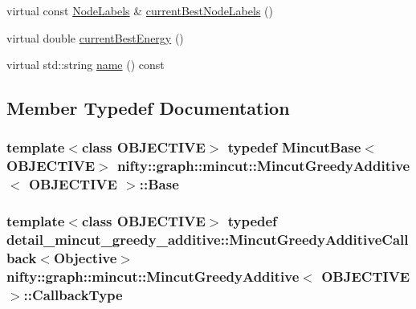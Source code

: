 \begin{DoxyCompactItemize}
virtual const \hyperlink{classnifty_1_1graph_1_1mincut_1_1MincutGreedyAdditive_a462b79779cfbe6ddd82b9e85097ddd3c}{Node\+Labels} \& \hyperlink{classnifty_1_1graph_1_1mincut_1_1MincutGreedyAdditive_aa2e46a61601c171a26a5ef547922084c}{current\+Best\+Node\+Labels} ()
\item 
virtual double \hyperlink{classnifty_1_1graph_1_1mincut_1_1MincutGreedyAdditive_a1c9e625fd28ab644b7cef248e021d412}{current\+Best\+Energy} ()
\item 
virtual std\+::string \hyperlink{classnifty_1_1graph_1_1mincut_1_1MincutGreedyAdditive_aafc5961f3bf92f0053bf3428e5a82786}{name} () const 
\end{DoxyCompactItemize}


\subsection{Member Typedef Documentation}
\hypertarget{classnifty_1_1graph_1_1mincut_1_1MincutGreedyAdditive_aeb493d49b53f21cf9c644baa3b3d00f7}{}
\subsubsection[{Base}]{\setlength{\rightskip}{0pt plus 5cm}template$<$class O\+B\+J\+E\+C\+T\+I\+V\+E$>$ typedef {\bf Mincut\+Base}$<$O\+B\+J\+E\+C\+T\+I\+V\+E$>$ {\bf nifty\+::graph\+::mincut\+::\+Mincut\+Greedy\+Additive}$<$ O\+B\+J\+E\+C\+T\+I\+V\+E $>$\+::{\bf Base}}\label{classnifty_1_1graph_1_1mincut_1_1MincutGreedyAdditive_aeb493d49b53f21cf9c644baa3b3d00f7}
\hypertarget{classnifty_1_1graph_1_1mincut_1_1MincutGreedyAdditive_ae6b2e0ee7b987b72e961224161b68c0a}{}
\subsubsection[{Callback\+Type}]{\setlength{\rightskip}{0pt plus 5cm}template$<$class O\+B\+J\+E\+C\+T\+I\+V\+E$>$ typedef detail\+\_\+mincut\+\_\+greedy\+\_\+additive\+::\+Mincut\+Greedy\+Additive\+Callback$<${\bf Objective}$>$ {\bf nifty\+::graph\+::mincut\+::\+Mincut\+Greedy\+Additive}$<$ O\+B\+J\+E\+C\+T\+I\+V\+E $>$\+::{\bf Callback\+Type}}\label{classnifty_1_1graph_1_1mincut_1_1MincutGreedyAdditive_ae6b2e0ee7b987b72e961224161b68c0a}
\hypertarget{classnifty_1_1graph_1_1mincut_1_1MincutGreedyAdditive_a12888919099a9985cffc747e7f3fc1ed}{}
